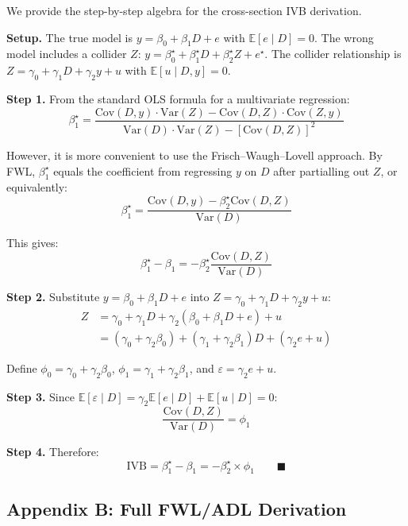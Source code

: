 \documentclass[
]{article}
\begin{document}
We provide the step-by-step algebra for the cross-section IVB
derivation.

\textbf{Setup.} The true model is \(y = \beta_0 + \beta_1 D + e\) with
\(\mathbb{E}[e \mid D] = 0\). The wrong model includes a collider \(Z\):
\(y = \beta_0^{\star} + \beta_1^{\star} D + \beta_2^{\star} Z + e^{\star}\).
The collider relationship is
\(Z = \gamma_0 + \gamma_1 D + \gamma_2 y + u\) with
\(\mathbb{E}[u \mid D, y] = 0\).

\textbf{Step 1.} From the standard OLS formula for a multivariate
regression: \[
\beta_1^{\star} = \frac{\text{Cov}(D, y) \cdot \text{Var}(Z) - \text{Cov}(D, Z) \cdot \text{Cov}(Z, y)}{\text{Var}(D) \cdot \text{Var}(Z) - [\text{Cov}(D, Z)]^2}
\]

However, it is more convenient to use the Frisch--Waugh--Lovell
approach. By FWL, \(\beta_1^{\star}\) equals the coefficient from
regressing \(y\) on \(D\) after partialling out \(Z\), or equivalently:
\[
\beta_1^{\star} = \frac{\text{Cov}(D, y) - \beta_2^{\star} \text{Cov}(D, Z)}{\text{Var}(D)}
\]

This gives: \[
\beta_1^{\star} - \beta_1 = -\beta_2^{\star} \frac{\text{Cov}(D, Z)}{\text{Var}(D)}
\]

\textbf{Step 2.} Substitute \(y = \beta_0 + \beta_1 D + e\) into
\(Z = \gamma_0 + \gamma_1 D + \gamma_2 y + u\): \begin{align*}
Z &= \gamma_0 + \gamma_1 D + \gamma_2(\beta_0 + \beta_1 D + e) + u \\
  &= (\gamma_0 + \gamma_2 \beta_0) + (\gamma_1 + \gamma_2 \beta_1) D + (\gamma_2 e + u)
\end{align*}

Define \(\phi_0 = \gamma_0 + \gamma_2 \beta_0\),
\(\phi_1 = \gamma_1 + \gamma_2 \beta_1\), and
\(\varepsilon = \gamma_2 e + u\).

\textbf{Step 3.} Since
\(\mathbb{E}[\varepsilon \mid D] = \gamma_2 \mathbb{E}[e \mid D] + \mathbb{E}[u \mid D] = 0\):
\[
\frac{\text{Cov}(D, Z)}{\text{Var}(D)} = \phi_1
\]

\textbf{Step 4.} Therefore: \[
\text{IVB} = \beta_1^{\star} - \beta_1 = -\beta_2^{\star} \times \phi_1 \qquad \blacksquare
\]

\subsection{\texorpdfstring{Appendix B: Full FWL/ADL Derivation
\label{app:adl}}{Appendix B: Full FWL/ADL Derivation }}\label{appendix-b-full-fwladl-derivation}
\end{document}
